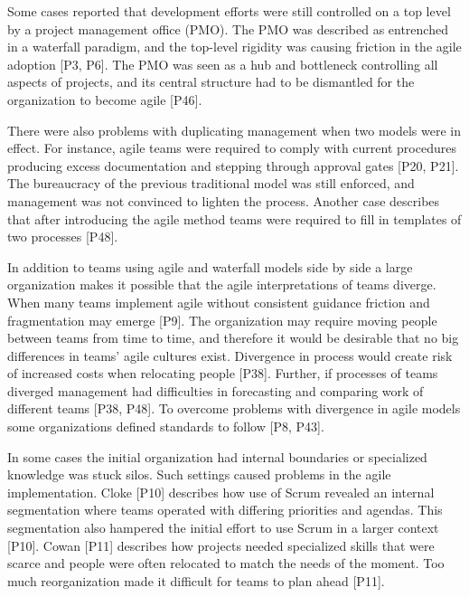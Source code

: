 Some cases reported that development efforts were still controlled on a top
level by a project management office (PMO). The PMO was described as entrenched
in a waterfall paradigm, and the top-level rigidity was causing friction in the
agile adoption [P3, P6]. The PMO was seen as a hub and bottleneck controlling
all aspects of projects, and its central structure had to be dismantled for the
organization to become agile [P46].

There were also problems with duplicating management when two models were in
effect. For instance, agile teams were required to comply with current
procedures producing excess documentation and stepping through approval gates
[P20, P21]. The bureaucracy of the previous traditional model was still enforced,
and management was not convinced to lighten the process. Another case describes
that after introducing the agile method teams were required to fill in templates
of two processes [P48].


In addition to teams using agile and waterfall models side by side a large
organization makes it possible that the agile interpretations of teams diverge.
When many teams implement agile without consistent guidance friction and
fragmentation may emerge [P9]. The organization may require moving people
between teams from time to time, and therefore it would be desirable that no big
differences in teams' agile cultures exist. Divergence in process would create
risk of increased costs when relocating people [P38].
Further, if processes of teams diverged management had difficulties in
forecasting and comparing work of different teams [P38, P48]. To overcome
problems with divergence in agile models some organizations defined standards to
follow [P8, P43].

In some cases the initial organization had internal boundaries or specialized
knowledge was stuck silos. Such settings caused problems in the agile
implementation.
Cloke [P10] describes how use of Scrum revealed an internal segmentation where
teams operated with differing priorities and agendas. This segmentation also
hampered the initial effort to use Scrum in a larger context [P10].
Cowan [P11] describes how projects needed specialized skills that were scarce
and people were often relocated to match the needs of the moment. Too much
reorganization made it difficult for teams to plan ahead [P11].

